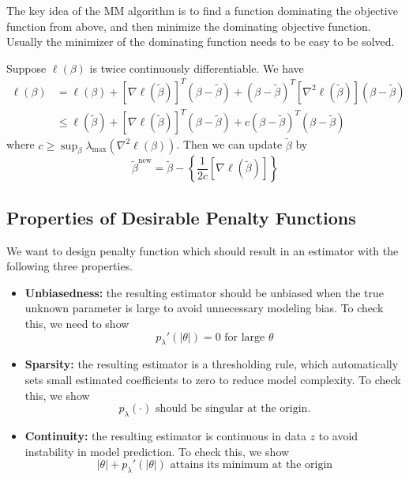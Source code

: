 \documentclass[12pt]{article}
\newcommand{\btilde}{\tilde{\beta}}
\numberwithin{equation}{section}
\begin{document}
The key idea of the MM algorithm is to find a function dominating the objective function from above, and then minimize the dominating objective function. Usually the minimizer of the dominating function needs to be easy to be solved.

Suppose $\ell(\beta)$ is twice continuously differentiable. We have
\begin{align*}
  \ell(\beta) &= \ell(\beta) + [\nabla \ell(\btilde)]^T (\beta - \btilde) + (\beta - \btilde)^T [\nabla^2 \ell(\btilde)](\beta - \btilde) \\
  & \le \ell(\btilde) + [\nabla \ell(\btilde)]^T (\beta - \btilde) + c(\beta - \btilde)^T (\beta - \btilde)
\end{align*}
where 
$c \ge \sup_{\beta} \lambda_{\text{max}}(\nabla^2 \ell(\beta))$. Then we can update $\btilde$ by
\begin{equation*}
  \btilde^{\text{new}} = \btilde - \left\{
    \frac{1}{2c} [\nabla \ell(\btilde)]
  \right\}
\end{equation*}



\newpage
\subsection{Properties of Desirable Penalty Functions}
We want to design penalty function which should result in an estimator with the following three properties.
\begin{itemize}
  \item \textbf{Unbiasedness:} the resulting estimator should be unbiased when the true unknown parameter is large to avoid unnecessary modeling bias. To check this, we need to show
  \begin{equation*}
    p_{\lambda}'(|\theta|) = 0 \text{ for large } \theta
  \end{equation*}
  \item \textbf{Sparsity:} the resulting estimator is a thresholding rule, which automatically sets small estimated coefficients to zero to reduce model complexity. To check this, we show
  \begin{equation*}
    p_{\lambda}(\cdot) \text{ should be singular at the origin.}
  \end{equation*}
  \item \textbf{Continuity:} the resulting estimator is continuous in data $z$ to avoid instability in model prediction. To check this, we show
  \begin{equation*}
    |\theta| + p_{\lambda}'(|\theta|) \text{ attains its minimum at the origin}
  \end{equation*}
\end{itemize}


%
\end{document}
